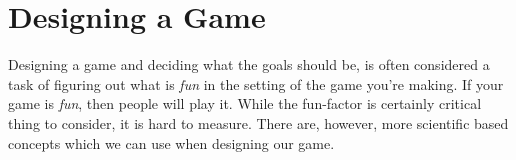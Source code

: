 \section{Designing a Game}
Designing a game and deciding what the goals should be, is often considered a task of figuring out what is \emph{fun} in the setting of the game you're making. 
If your game is \emph{fun}, then people will play it. 
While the fun-factor is certainly critical thing to consider, it is hard to measure.
There are, however, more scientific based concepts which we can use when designing our game.

